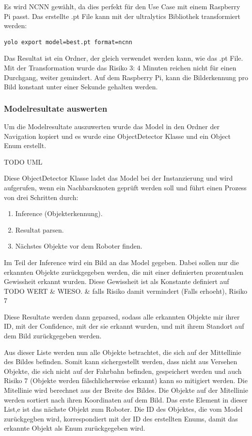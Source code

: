 Es wird NCNN gewählt, da dies perfekt für den Use Case mit einem Raspberry Pi passt. Das erstellte .pt File kann mit der ultralytics Bibliothek transformiert werden:

\begin{verbatim}
yolo export model=best.pt format=ncnn
\end{verbatim}

Das Resultat ist ein Ordner, der gleich verwendet werden kann, wie das .pt File. Mit der Transformation wurde das Risiko 3: 4 Minuten reichen nicht für einen Durchgang, weiter gemindert. Auf dem Raspberry Pi, kann die Bilderkennung pro Bild konstant unter einer Sekunde gehalten werden.

\subsubsection{Modelresultate auswerten}
\label{model-results}

Um die Modelresultate auszuwerten wurde das Model in den Ordner der Navigation kopiert und es wurde eine ObjectDetector Klasse und ein Object Enum erstellt.

TODO UML

Diese ObjectDetector Klasse ladet das Model bei der Instanzierung und wird aufgerufen, wenn ein Nachbarsknoten geprüft werden soll und führt einen Prozess von drei Schritten durch:

\begin{enumerate}
    \item Inference (Objekterkennung).
    \item Resultat parsen.
    \item Nächstes Objekte vor dem Roboter finden.
\end{enumerate}

Im Teil der Inference wird ein Bild an das Model gegeben. Dabei sollen nur die erkannten Objekte zurückgegeben werden, die mit einer definierten prozentualen Gewissheit erkannt wurden. Diese Gewissheit ist als Konstante definiert auf TODO WERT \& WIESO. \& falls Risiko damit vermindert (Falls erhoeht), Risiko 7

Diese Resultate werden dann geparsed, sodass alle erkannten Objekte mir ihrer ID, mit der Confidence, mit der sie erkannt wurden, und mit ihrem Standort auf dem Bild zurückgegeben werden.

Aus dieser Liste werden nun alle Objekte betrachtet, die sich auf der Mittellinie des Bildes befinden. Somit kann sichergestellt werden, dass nicht aus Versehen Objekte, die sich nicht auf der Fahrbahn befinden, gespeichert werden und auch Risiko 7 (Objekte werden fälschlicherweise erkannt) kann so mitigiert werden. Die Mitellinie wird berechnet aus der Breite des Bildes. Die Objekte auf der Mitellinie werden sortiert nach ihren Koordinaten auf dem Bild. Das erste Element in dieser List,e ist das nächste Objekt zum Roboter. Die ID des Objektes, die vom Model zurückgegben wird, korrespondiert mit der ID des erstellten Enums, damit das erkannte Objekt als Enum zurückgegeben wird.

